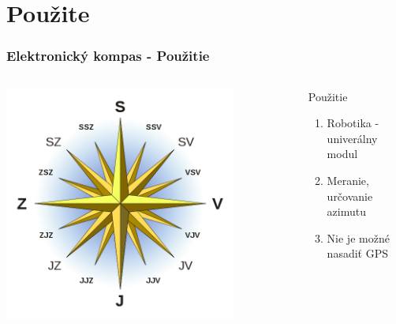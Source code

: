 \section{Použite}
\begin{snimka}
 \frametitle{Elektronický kompas - Použitie}
   \begin{columns}[c]
    \begin{column}{0.6\textwidth}
     \begin{center}
        \includegraphics[width=0.8\textwidth]{obr/kompas.png}
      \end{center}
    \end{column}
    \begin{column}{0.4\textwidth}
    \begin{block}{Použitie}
    \begin{enumerate}
         \item Robotika - univerálny modul
         \item Meranie, určovanie azimutu
         \item Nie je možné nasadiť GPS
	\end{enumerate}
  \end{block}
        \end{column}
  \end{columns}
\end{snimka}